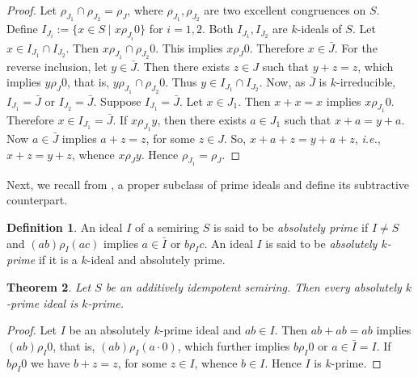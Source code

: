 \documentclass[11pt,leqno]{amsart}
\newtheorem{theorem}{Theorem}[section]
\theoremstyle{definition}
\newtheorem{definition}[theorem]{Definition}
\newtheorem{remark}[theorem]{Remark}
\numberwithin{equation}{section}
\begin{document}
 \begin{proof}
     Let $\rho_{J_1}\cap \rho_{J_2}=\rho_J$, where $\rho_{J_1}, \rho_{J_2}$ are two excellent congruences on $S$. Define $I_{J_i}:=\{x\in S \mid x\rho_{J_i}0\}$ for $i=1,2$. Both $I_{J_1}, I_{J_2}$ are $k$-ideals of $S$. Let $x\in I_{J_1}\cap I_{J_2}$. Then $x\rho_{J_1}\cap \rho_{J_2}0$. This implies $x\rho_J0$. Therefore $x\in \bar{J}$. For the reverse inclusion, let $y\in \bar{J}$. Then there exists $z\in J$ such that $y+z=z$, which implies $y\rho_J0$, that is, $y\rho_{J_1}\cap \rho_{J_2}0$. Thus $y\in I_{J_1}\cap I_{J_2}$. Now, as $\bar{J}$ is $k$-irreducible, $I_{J_1}=\bar{J}$ or $I_{J_2}=\bar{J}$. Suppose $I_{J_1}=\bar{J}$. Let $x\in J_1$. Then $x+x=x$ implies $x\rho_{J_1}0$. Therefore $x\in I_{J_1}=\bar{J}$. If $x\rho_{J_1}y$, then there exists $a\in J_1$ such that $x+a=y+a$. Now $a\in \bar{J}$ implies $a+z=z$, for some $z\in J$. So, $x+a+z=y+a+z$, \textit{i.e.}, $x+z=y+z$, whence $x\rho_Jy$. Hence $\rho_{J_1}=\rho_J$.
 \end{proof}

Next, we recall from  \cite[Definition 3.10]{Lescot11}, a proper subclass of prime ideals and define its subtractive counterpart. 

 \begin{definition}
 An ideal $I$ of a semiring $S$ is said to be \emph{absolutely prime} if $I\neq S$ and $(ab)\rho_I(ac)$ implies $a\in \bar{I}$ or $b\rho_Ic$.
    An ideal $I$ is said to be \emph{absolutely $k$-prime} if it is a $k$-ideal and absolutely prime.   
 \end{definition}
 
 \begin{theorem}
     Let $S$ be an additively idempotent semiring. Then every absolutely $k$-prime ideal is $k$-prime.
 \end{theorem}
 
 \begin{proof}
     Let $I$ be an absolutely $k$-prime ideal and $ab\in I$. Then $ab+ab=ab$ implies $(ab)\rho_I0$, that is, $(ab)\rho_I(a\cdot 0)$, which further implies $b\rho_I0$ or $a\in \bar{I}=I$. If $b\rho_I0$ we have $b+z=z$, for some $z\in I$, whence $b\in I$. Hence $I$ is $k$-prime.
 \end{proof}
 
\end{document}
